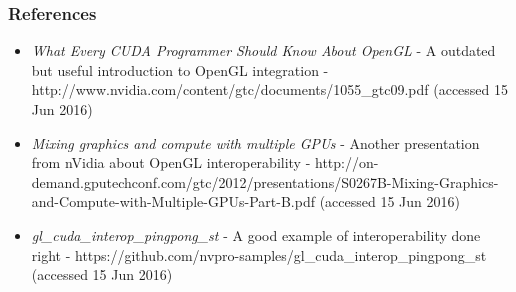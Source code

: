 \begin{frame}

\frametitle{References}

\begin{itemize}
	\item{\emph{What Every CUDA Programmer Should Know About OpenGL} -
		A outdated but useful introduction to OpenGL integration -
		http://www.nvidia.com/content/gtc/documents/1055\_gtc09.pdf (accessed 15 Jun 2016)}
	\item{\emph{Mixing graphics and compute with multiple GPUs} -
		Another presentation from nVidia about OpenGL interoperability -
		http://on-demand.gputechconf.com/gtc/2012/presentations/S0267B-Mixing-Graphics-and-Compute-with-Multiple-GPUs-Part-B.pdf (accessed 15 Jun 2016)}
	\item{\emph{gl\_cuda\_interop\_pingpong\_st} -
		A good example of interoperability done right -
		https://github.com/nvpro-samples/gl\_cuda\_interop\_pingpong\_st (accessed 15 Jun 2016)}
\end{itemize}

\end{frame}
